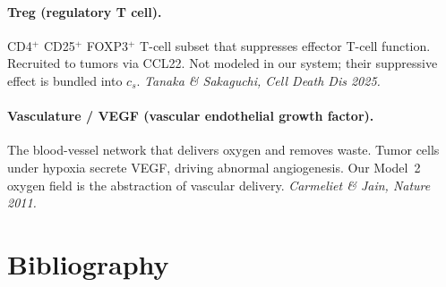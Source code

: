 \documentclass[11pt,letterpaper]{article}
\begin{document}
\paragraph{Treg (regulatory T cell).}
CD4$^+$ CD25$^+$ FOXP3$^+$ T-cell subset that suppresses effector T-cell
function. Recruited to tumors via CCL22. Not modeled in our system;
their suppressive effect is bundled into $c_s$.
\emph{Tanaka \& Sakaguchi, Cell Death Dis 2025.}

\paragraph{Vasculature / VEGF (vascular endothelial growth factor).}
The blood-vessel network that delivers oxygen and removes waste.
Tumor cells under hypoxia secrete VEGF, driving abnormal angiogenesis.
Our Model~2 oxygen field is the abstraction of vascular delivery.
\emph{Carmeliet \& Jain, Nature 2011.}

\section*{Bibliography}
\end{document}
